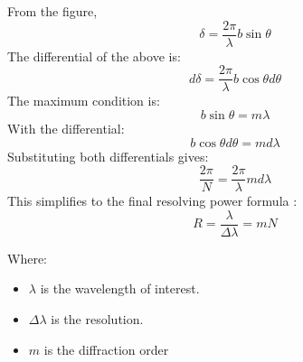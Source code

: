 From the figure, 
\begin{equation}
\delta = \frac{2\pi}{\lambda}b\sin{\theta}
\end{equation}
The differential of the above is: 
\begin{equation}
d\delta = \frac{2\pi}{\lambda}b\cos{\theta}d\theta
\end{equation}
The maximum condition is:
\begin{equation}
b\sin{\theta} = m\lambda
\end{equation}
With the differential:
\begin{equation}
b\cos{\theta}d\theta = md\lambda
\end{equation}
Substituting both differentials gives:
\begin{equation}
\frac{2\pi}{N} = \frac{2\pi}{\lambda}md\lambda
\end{equation}
This simplifies to the final resolving power formula \cite{Hyperphysics}:
\begin{equation}
\boxed{R = \frac{\lambda}{\Delta \lambda} = mN}
\end{equation}

Where:
\begin{itemize}[label={}]
    \item $\lambda$ is the wavelength of interest.
    \item $\Delta \lambda$ is the resolution.
    \item $m$ is the diffraction order
\end{itemize}